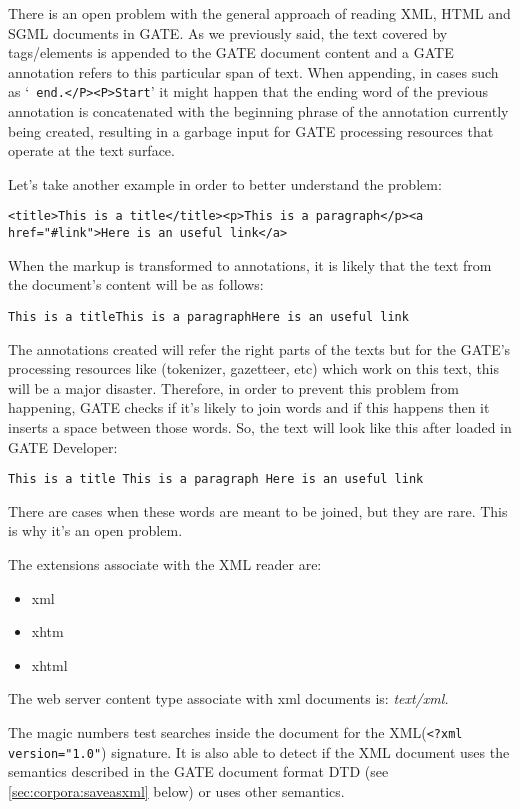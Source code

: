 There is an open problem with the general approach of reading XML, HTML and SGML
documents in GATE. As we previously said, the text covered by tags/elements is
appended to the GATE document content and a GATE annotation refers to this
particular span of text. When appending, in cases such as `{\tt
end.</P><P>Start}' it might happen that the ending word of the previous
annotation is concatenated with the beginning phrase of the annotation currently
being created, resulting in a garbage input for GATE processing resources that
operate at the text surface.

Let's take another example in order to better understand the
problem:

\small
\begin{small}
\begin{verbatim}
<title>This is a title</title><p>This is a paragraph</p><a
href="#link">Here is an useful link</a>
\end{verbatim}
\end{small}
\nnormalsize

When the markup is transformed to annotations, it is likely that
the text from the document's content will be as follows:

{\tt This is a titleThis is a paragraphHere is an useful link}

The annotations created will refer the right parts of the texts
but for the GATE's processing resources like (tokenizer, gazetteer,
etc) which work on this text, this will be a major disaster.
Therefore, in order to prevent this problem from happening, GATE
checks if it's likely to join words and if this happens then it
inserts a space between those words. So, the text will look like
this after loaded in GATE Developer:

{\tt This is a title This is a paragraph Here is an useful link}

There are cases when these words are meant to be joined, but they
are rare. This is why it's an open problem.

The extensions associate with the XML reader are:
\begin{itemize}
\item
xml
\item
xhtm
\item
xhtml
\end{itemize}

The web server content type associate with xml documents is: {\em
text/xml.}

The magic numbers test searches inside the document for the XML({\tt <?xml
version="1.0"}) signature. It is also able to detect if the XML document uses the
semantics described in the GATE document format DTD (see
\ref{sec:corpora:saveasxml} below) or uses other semantics.

